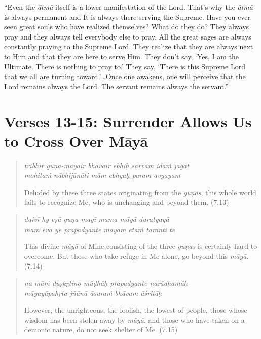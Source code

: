 \documentclass[12pt, twoside, openright]{memoir}
\begin{document}
\enquote{Even the \textit{ātmā} itself is a lower manifestation of the Lord. That’s why the \textit{ātmā} is always permanent and It is always there serving the Supreme. Have you ever seen great souls who have realized themselves? What do they do? They always pray and they always tell everybody else to pray. All the great sages are always constantly praying to the Supreme Lord. They realize that they are always next to Him and that they are here to serve Him. They don’t say, \enquote{Yes, I am the Ultimate. There is nothing to pray to.} They say, \enquote{There is this Supreme Lord that we all are turning toward.}\ldots Once one awakens, one will perceive that the Lord remains always the Lord. The servant remains always the servant.}

\section{Verses 13-15: Surrender Allows Us to Cross Over Māyā}\label{sec-verses-13-15-surrender-allows-us-to-cross-over-maya}


\par
\begin{verse}
\textit{tribhir guṇa-mayair bhāvair ebhiḥ sarvam idaṁ jagat} \\
\textit{mohitaṁ nābhijānāti mām ebhyaḥ param avyayam}

\noindent Deluded by these three states originating from the \textit{guṇas}, this whole world fails to recognize Me, who is unchanging and beyond them. (7.13)
\end{verse}
\par



\par
\begin{verse}
\textit{daivī hy eṣā guṇa-mayī mama māyā duratyayā} \\
\textit{mām eva ye prapadyante māyām etāṁ taranti te}

\noindent This divine \textit{māyā} of Mine consisting of the three \textit{guṇas} is certainly hard to overcome. But those who take refuge in Me alone, go beyond this \textit{māyā}. (7.14)
\end{verse}
\par



\par
\begin{verse}
\textit{na māṁ duṣkṛtino mūḍhāḥ prapadyante narādhamāḥ} \\
\textit{māyayāpahṛta-jñānā āsuraṁ bhāvam āśritāḥ}

\noindent However, the unrighteous, the foolish, the lowest of people, those whose wisdom has been stolen away by \textit{māyā}, and those who have taken on a demonic nature, do not seek shelter of Me. (7.15)
\end{verse}
\par
\end{document}
